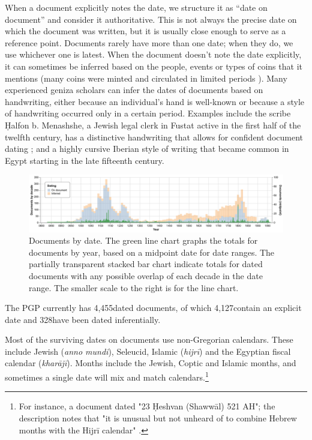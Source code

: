 \documentclass{article}
\def\totalDatedDocs{4,455}
\def\totalDateOnDoc{4,127}
\def\totalInferredDate{328}
\begin{document}
When a document explicitly notes the date, we structure it as “date on document” and consider it authoritative. This is not always the precise date on which the document was written, but it is usually close enough to serve as a reference point. Documents rarely have more than one date; when they do, we use whichever one is latest. When the document doesn't note the date explicitly, it can sometimes be inferred based on the people, events or types of coins that it mentions (many coins were minted and circulated in limited periods \autocite{dudley_coins_2023}). Many experienced geniza scholars can infer the dates of documents based on handwriting, either because an individual’s hand is well-known or because a style of handwriting occurred only in a certain period. Examples include the scribe Ḥalfon b. Menashshe, a Jewish legal clerk in Fustat active in the first half of the twelfth century, has a distinctive handwriting that allows for confident document dating \autocite{elbaum_halfon_nodate}; and a highly cursive Iberian style of writing that became common in Egypt starting in the late fifteenth century.

\begin{figure}[!hbt]
  \centering
  \includegraphics[width=\textwidth]{charts/combined_dating.pdf}
  \caption{Documents by date. The green line chart graphs the totals for documents by year, based on a midpoint date for date ranges. The partially transparent stacked bar chart indicate totals for dated documents with any possible overlap of each decade in the date range. The smaller scale to the right is for the line chart.}
  \label{fig:docs_dating_combined}
\end{figure}


The PGP currently has \totalDatedDocs\space dated documents, of which \totalDateOnDoc\space contain an explicit date and \totalInferredDate\space have been dated inferentially.  

Most of the surviving dates on documents use non-Gregorian calendars. These include Jewish (\textit{anno mundi}),  Seleucid, Islamic (\textit{hijrī}) and the Egyptian fiscal calendar (\textit{kharājī}). Months include the Jewish, Coptic and Islamic months, and sometimes a single date will mix and match calendars.\footnote{For instance, a document dated "23 Ḥeshvan (Shawwāl) 521 AH";  the description notes that "it is unusual but not unheard of to combine Hebrew months with the Hijrī calendar" \autocite{noauthor_legal_1127} .} 
\end{document}
